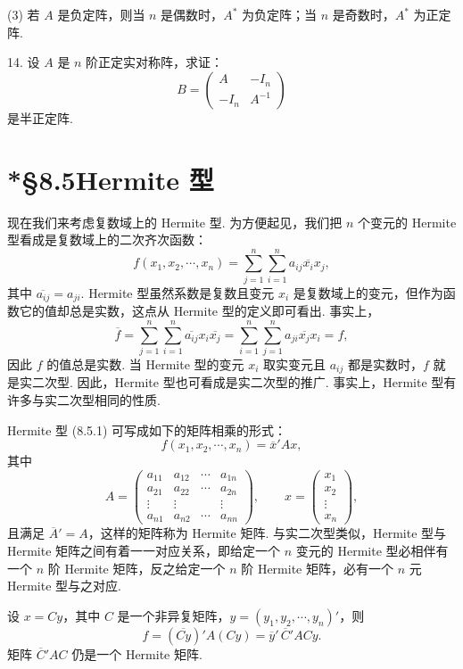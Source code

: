 \documentclass[UTF8, 12pt, fontset=fandol, oneside]{ctexart}
\begin{document}
(3) 若 $A$ 是负定阵，则当 $n$ 是偶数时，$A^*$ 为负定阵；当 $n$ 是奇数时，$A^*$ 为正定阵.

14. 设 $A$ 是 $n$ 阶正定实对称阵，求证：
\[
B=\left(\begin{array}{cc}A&-I_n\\ -I_n&A^{-1}\end{array}\right)
\]
是半正定阵.

\section*{*§8.5\quad Hermite 型}

现在我们来考虑复数域上的 Hermite 型. 为方便起见，我们把 $n$ 个变元的 Hermite 型看成是复数域上的二次齐次函数：
\begin{equation}
f(x_1,x_2,\cdots,x_n)=\sum_{j=1}^n\sum_{i=1}^n a_{ij}\overline{x_i}x_j,
\tag{8.5.1}
\end{equation}
其中 $\overline{a_{ij}}=a_{ji}$. Hermite 型虽然系数是复数且变元 $x_i$ 是复数域上的变元，但作为函数它的值却总是实数，这点从 Hermite 型的定义即可看出. 事实上，
\[
\overline{f}=\sum_{j=1}^n\sum_{i=1}^n \overline{a_{ij}}x_i\overline{x_j}
=\sum_{i=1}^n\sum_{j=1}^n a_{ji}\overline{x_j}x_i=f,
\]
因此 $f$ 的值总是实数. 当 Hermite 型的变元 $x_i$ 取实变元且 $a_{ij}$ 都是实数时，$f$ 就是实二次型. 因此，Hermite 型也可看成是实二次型的推广. 事实上，Hermite 型有许多与实二次型相同的性质.

Hermite 型 (8.5.1) 可写成如下的矩阵相乘的形式：
\[
f(x_1,x_2,\cdots,x_n)=\overline{x}'Ax,
\]
其中
\[
A=\left(\begin{array}{cccc}
a_{11}&a_{12}&\cdots&a_{1n}\\
a_{21}&a_{22}&\cdots&a_{2n}\\
\vdots&\vdots&&\vdots\\
a_{n1}&a_{n2}&\cdots&a_{nn}
\end{array}\right),\qquad
x=\left(\begin{array}{c}x_1\\x_2\\ \vdots\\x_n\end{array}\right),
\]
且满足 $\overline{A}'=A$，这样的矩阵称为 Hermite 矩阵. 与实二次型类似，Hermite 型与 Hermite 矩阵之间有着一一对应关系，即给定一个 $n$ 变元的 Hermite 型必相伴有一个 $n$ 阶 Hermite 矩阵，反之给定一个 $n$ 阶 Hermite 矩阵，必有一个 $n$ 元 Hermite 型与之对应.

设 $x=Cy$，其中 $C$ 是一个非异复矩阵，$y=(y_1,y_2,\cdots,y_n)'$，则
\[
f=(\overline{Cy})'A(Cy)=\overline{y}'\,\overline{C}'ACy.
\]
矩阵 $\overline{C}'AC$ 仍是一个 Hermite 矩阵.
\end{document}
